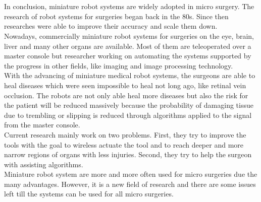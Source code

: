 \chapter{}
\label{sec:results}
In conclusion, miniature robot systems are widely adopted in micro surgery. The research of  robot systems for surgeries began back in the 80s. Since then researches were able to improve their accuracy and scale them down. \\
Nowadays, commercially miniature robot systems for surgeries on the eye, brain, liver and many other organs  are available. Most of them are teleoperated over a master console but researcher working on automating the systems supported by the progress in other fields, like imaging and image processing technology. \\
With the advancing of miniature medical robot systems, the surgeons are able to heal diseases which were seen impossible to heal not long ago, like retinal vein occlusion. The robots are not only able heal more diseases but also the risk for the patient will be reduced massively because the probability of damaging tissue due to trembling or slipping is reduced through algorithms applied to the signal from the master console. \\
Current research mainly work on two problems. First, they try to improve the tools with the goal to wireless actuate the tool and to reach deeper and more narrow regions of organs with less injuries. Second, they try to help the surgeon with assisting algorithms. \\
Miniature robot system are more and more often used for micro surgeries due the many advantages. However, it is a new field of research and there are some issues left till the systems can be used for all micro surgeries. 